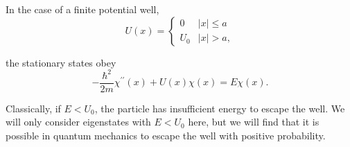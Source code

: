 \documentclass[a4paper]{article}
\begin{document}
\begin{example}
    In the case of a finite potential well,
    \[
    U(x)= \begin{cases}0 & |x| \leq a \\ U_0 & |x|>a,\end{cases}
    \]
    \begin{center}
    \end{center}
    the stationary states obey
    \[
    -\frac{\hbar^2}{2 m} \chi^{\prime \prime}(x)+U(x) \chi(x)=E \chi(x) .
    \]
\end{example}

Classically, if \( E < U_0 \), the particle has insufficient energy to escape the well.
We will only consider eigenstates with \( E < U_0 \) here, but we will find that it is possible in quantum mechanics to escape the well with positive probability.
\end{document}
